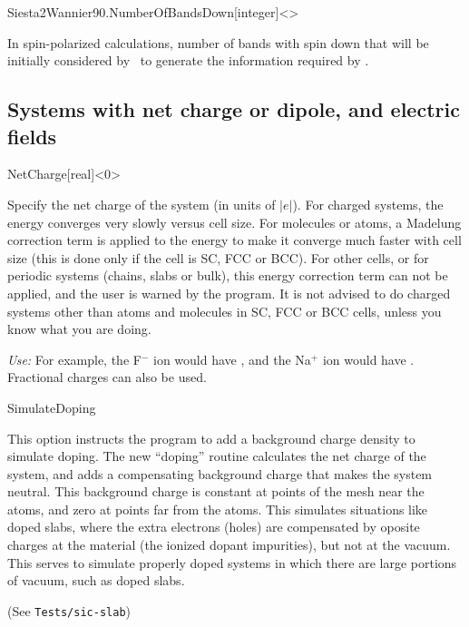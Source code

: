 \begin{fdfentry}{Siesta2Wannier90.NumberOfBandsDown}[integer]<>

  In spin-polarized calculations, number of bands with spin down that
  will be initially considered by \siesta\ to generate the information
  required by .

\end{fdfentry}



\subsection{Systems with net charge or dipole, and electric fields}

\begin{fdfentry}{NetCharge}[real]<$0$>%

  Specify the net charge of the system (in units of $|e|$).  For
  charged systems, the energy converges very slowly versus cell
  size. For molecules or atoms, a Madelung correction term is applied
  to the energy to make it converge much faster with cell size (this
  is done only if the cell is SC, FCC or BCC). For other cells, or for
  periodic systems (chains, slabs or bulk), this energy correction
  term can not be applied, and the user is warned by the program. It
  is not advised to do charged systems other than atoms and molecules
  in SC, FCC or BCC cells, unless you know what you are doing.

  \textit{Use:} For example, the F$^-$ ion would have 
   , and the Na$^+$ ion would have  .
  Fractional charges can also be used.
  
\end{fdfentry}


\begin{fdflogicalF}{SimulateDoping}

  This option instructs the program to add a background charge density
  to simulate doping.  The new ``doping'' routine calculates the net
  charge of the system, and adds a compensating background charge that
  makes the system neutral. This background charge is constant at
  points of the mesh near the atoms, and zero at points far from the
  atoms.  This simulates situations like doped slabs, where the extra
  electrons (holes) are compensated by oposite charges at the material
  (the ionized dopant impurities), but not at the vacuum.  This serves
  to simulate properly doped systems in which there are large portions
  of vacuum, such as doped slabs.

  (See \texttt{Tests/sic-slab})

\end{fdflogicalF}

